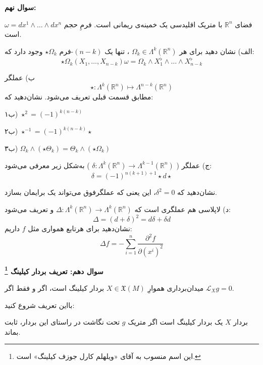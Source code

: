 \documentclass[a4paper, 12pt]{article}
\newenvironment{parind}{%
	\par%
	\medskip
	\leftskip=0mm\rightskip=7mm
	\noindent\ignorespaces}{%
	\par\medskip}
\begin{document}
\newpage
\textbf{سوال نهم:
}

\vspace{0.7em}
فضای 
$\mathbb{R}^n$
 با متریک اقلیدسی یک خمینه‌ی ریمانی است. فرمِ حجم
 $\omega = dx^1 \wedge \dots \wedge dx^n$
 است.
 \begin{parind}
 	الف) نشان دهید برای هر 
 	$\Omega_k \in \Lambda^k(\mathbb{R}^n)$
 	، تنها یک 
 	$(n-k)$-فرم
 	$\star\Omega_k$
 	وجود دارد که:
 	\[
 	\star\Omega_k (X_1 ,\dots ,X_{n-k}) \omega = \Omega_k \wedge X_1^\flat \wedge \dots \wedge X_{n-k}^\flat
 	\]
 	
 	ب) عملگر 
 	\[
 	\star: \Lambda^k (\mathbb{R}^n) \longmapsto \Lambda^{n-k}(\mathbb{R}^n)
 	\]
 	مطابق قسمت قبلی تعریف می‌شود. نشان‌دهید که:
 	
 	\hspace{8mm}
 	ب۱) 
 	$\star^2 = (-1)^{k(n-k)}$
 	
 	\hspace{8mm}
 	ب۲)
 	$\star^{-1} = (-1)^{k(n-k)}\star $
 	
 	\hspace{8mm}
 	ب۳)
 	$\Omega_k \wedge (\star\Theta_k) = \Theta_k \wedge  (\star\Omega_k)$
 	
 	
ج) عملگر 
 (
 $\delta : \Lambda^k(\mathbb{R}^n) \xrightarrow{\quad} \Lambda^{k-1} (\mathbb{R}^{n})$
 )
 به‌شکل زیر معرفی می‌شود:
 \[
 \delta = (-1)^{n(k+1)+1} \star d \star
 \]
 
 نشان‌دهید که 
 $\delta^2=0$، این یعنی که عملگر‌فوق می‌تواند یک 
 برایمان بسازد.
 
 د) لاپلاسی هم عملگری است که 
 $\Delta: \Lambda^k(\mathbb{R}^n) \xrightarrow{\quad} \Lambda^{k} (\mathbb{R}^{n})$
  و تعریف می‌شود:
  \[
  \Delta = (d+\delta)^2 = d\delta + \delta d
  \]
  نشان‌دهید برای هرتابع همواری مثل $f$ داریم:
  \[
  \Delta f = -\sum_{i=1}^n \frac{\partial^2 f}{\partial(x^i)^2}
  \]
 \end{parind}






\newpage
\textbf{سوال دهم:
تعریف بردار کیلینگ
\footnote{
این اسم منسوب به آقای «ویلهلم کارل جوزف کیلینگ» است.
}
}

\vspace{0.7em}
میدان‌برداری هموارِ
$X \in \mathfrak{X}(M)$  بردار کیلینگ است، اگر و فقط اگر 
$\mathcal{L}_X g = 0$.

\begin{mdframed}
	با‌این تعریف شروع کنید:
	
	بردار $X$ یک بردار کیلینگ است اگر متریک $g$ تحت نگاشت 
	در راستای 
	این بردار، ثابت بماند.
\end{mdframed}
\end{document}
